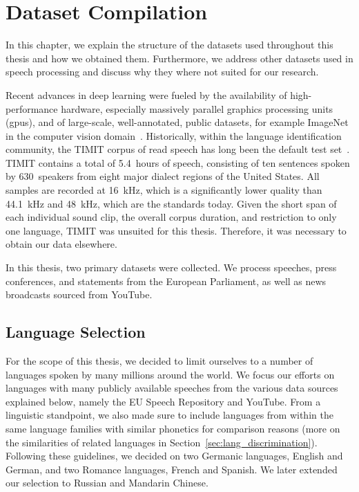 \section{Dataset Compilation}
\label{sec:datasets}
	In this chapter, we explain the structure of the datasets used throughout this thesis and how we obtained them.
	Furthermore, we address other datasets used in speech processing and discuss why they where not suited for our research.

	Recent advances in deep learning were fueled by the availability of high-performance hardware, especially massively parallel graphics processing units (\ac{gpu}s), and of large-scale, well-annotated, public datasets, for example ImageNet in the computer vision domain~\cite{ILSVRC15}. Historically, within the language identification community, the TIMIT corpus of read speech has long been the default test set~\cite{garofolo1993darpa}. TIMIT contains a total of \num{5.4}~hours of speech, consisting of ten sentences spoken by \num{630}~speakers from eight major dialect regions of the United States. All samples are recorded at \SI{16}{\kilo\hertz}, which is a significantly lower quality than \SI{44.1}{\kilo\hertz} and \SI{48}{\kilo\hertz}, which are the standards today. Given the short span of each individual sound clip, the overall corpus duration, and restriction to only one language, TIMIT was unsuited for this thesis. Therefore, it was necessary to obtain our data elsewhere.

  	In this thesis, two primary datasets were collected. We process speeches, press conferences, and statements from the European Parliament, as well as news broadcasts sourced from YouTube.

\subsection{Language Selection}
For the scope of this thesis, we decided to limit ourselves to a number of languages spoken by many millions around the world. We focus our efforts on languages with many publicly available speeches from the various data sources explained below, namely the EU Speech Repository and YouTube. From a linguistic standpoint, we also made sure to include languages from within the same language families with similar phonetics for comparison reasons (more on the similarities of related languages in Section~\ref{sec:lang_discrimination}). Following these guidelines, we decided on two Germanic languages, English and German, and two Romance languages, French and Spanish. We later extended our selection to Russian and Mandarin Chinese.

